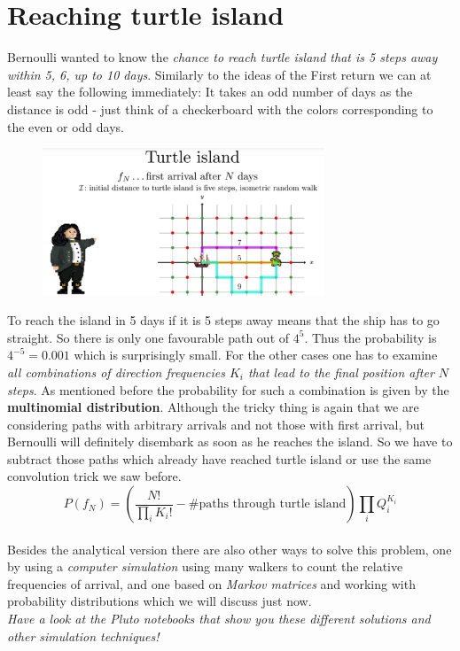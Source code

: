 \documentclass[12pt, a4paper]{scrartcl}
\begin{document}
\section*{Reaching turtle island}
Bernoulli wanted to know the \textit{chance to reach turtle island that is 5 steps away within 5, 6, up to 10 days}.
Similarly to the ideas of the First return we can at least say the following immediately: It takes an odd number of days as the distance is odd - just think of a checkerboard with the colors corresponding to the even or odd days.%
 \begin{figure}[H]
	\centering
	\includegraphics[width=0.75\textwidth]{5_7.png}
\end{figure}
To reach the island in 5 days if it is 5 steps away means that the ship has to go straight. 
So there is only one favourable path out of $4^5$. Thus the probability is
$4^{-5} = 0.001$ which is surprisingly small.
For the other cases one has to examine \textit{all combinations of direction frequencies $K_i$ that lead to the final position after $N$ steps}.
As mentioned before the probability for such a combination is given by the \textbf{multinomial distribution}. Although the tricky thing is again that we are considering paths with arbitrary arrivals and not those with first arrival, but Bernoulli will definitely disembark as soon as he reaches the island. 
So we have to subtract those paths which already have reached turtle island or use the same convolution trick we saw before.
\begin{equation*}\boxed{P(f_N)=\left(\frac{N!}{\prod_i K_i!}-\#\text{paths through turtle island}\right)\prod_i Q_i^{K_i}
}\end{equation*}\\
Besides the analytical version there are also other ways to solve this problem, one by using a \textit{computer simulation} using many walkers to count the relative frequencies of arrival, and one based on \textit{Markov matrices} and working with probability distributions which we will discuss just now.\\ \textit{Have a look at the Pluto notebooks that show you these different solutions and other simulation techniques!}\\
\end{document}
